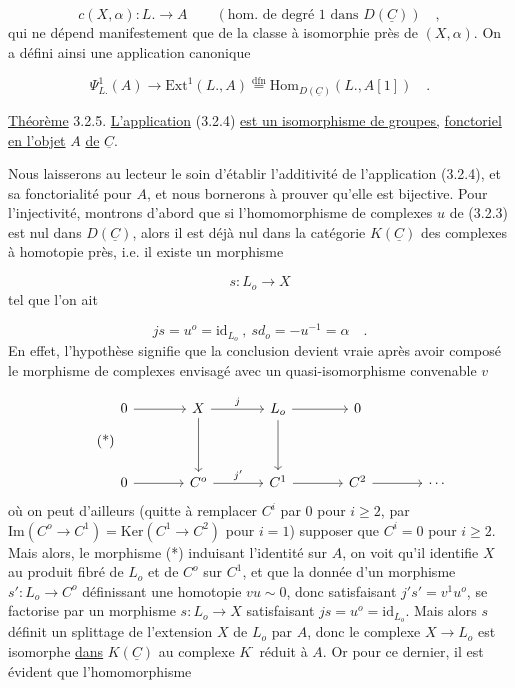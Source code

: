 \begin{equation}\tag{3.2.3}
c(X,\alpha) : L. \longrightarrow A \qquad (\text{hom. de degré 1 dans } D(\underline{C})) \quad ,
\end{equation}
qui ne dépend manifestement que de la classe à isomorphie près de $(X,\alpha)$. On a défini ainsi une application canonique

\begin{equation}\tag{3.2.4}
\Psi^1_{L.} (A) \longrightarrow \mathrm{Ext}^1(L., A) \overset{\mathrm{dfn}}{=} \mathrm{Hom}_{D(\underline{C})}(L., A[1]) \quad .
\end{equation}


\underline{Théorème} 3.2.5. \underline{L'application} (3.2.4) \underline{est un isomorphisme de groupes,} \underline{fonctoriel en l'objet} $A$ \underline{de} $\underline{C}$.

Nous laisserons au lecteur le soin d'établir l'additivité de l'application (3.2.4), et sa fonctorialité pour $A$, et nous bornerons à prouver qu'elle est bijective. Pour l'injectivité, montrons d'abord que si l'homomorphisme de complexes $u$ de (3.2.3) est nul dans $D(\underline{C})$, alors il est déjà nul dans la catégorie $K(\underline{C})$ des complexes à homotopie près, i.e. il existe un morphisme

\begin{equation*}
s : L_o \longrightarrow X
\end{equation*}
tel que l'on ait

\begin{equation}\tag{3.2.5.1}
js = u^o = \mathrm{id}_{L_o} \ , \ sd_o = - u^{-1} = \alpha \quad .
\end{equation}
En effet, l'hypothèse signifie que la conclusion devient vraie après avoir composé le morphisme de complexes envisagé avec un quasi-isomorphisme convenable $v$

\begin{equation}\tag{*}
\begin{tikzcd}[column sep=large, row sep=huge]
0 \arrow[r] & X \arrow[r, "j"] \arrow[d] & L_o \arrow[r] \arrow[d] & 0 \\
0 \arrow[r] & C^o \arrow[r, "j'"] & C^1 \arrow[r] & C^2 \arrow[r] & \cdots
\end{tikzcd}
\end{equation}
où on peut d'ailleurs (quitte à remplacer $C^i$ par $0$ pour $i \geq 2$, par $\mathrm{Im}(C^o \longrightarrow C^1) = \mathrm{Ker}(C^1 \longrightarrow C^2)$ pour $i = 1$) supposer que $C^i = 0$ pour $i \geq 2$. Mais alors, le morphisme (*) induisant l'identité sur $A$, on voit qu'il identifie $X$ au produit fibré de $L_o$ et de $C^o$ sur $C^1$, et que la donnée d'un morphisme $s' : L_o \longrightarrow C^o$ définissant une homotopie $vu \sim 0$, donc satisfaisant $j's' = v^1u^o$, se factorise par un morphisme $s : L_o \longrightarrow X$ satisfaisant $js = u^o = \mathrm{id}_{L_o}$. Mais alors $s$ définit un splittage de l'extension $X$ de $L_o$ par $A$, donc le complexe $X \longrightarrow L_o$ est isomorphe \underline{dans} $K(\underline{C})$ au complexe $K^{\cdot}$
réduit à $A$. Or pour ce dernier, il est évident que l'homomorphisme

